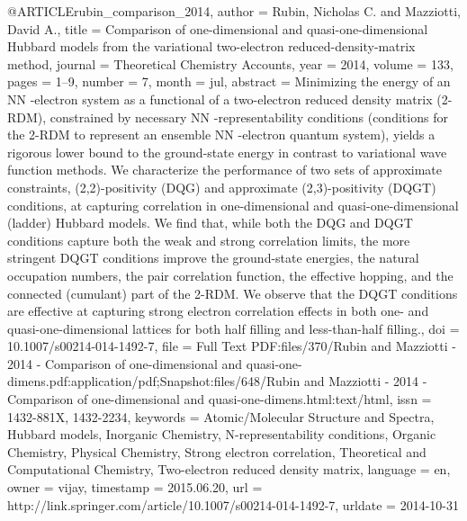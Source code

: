 @ARTICLE{rubin_comparison_2014,
  author = {Rubin, Nicholas C. and Mazziotti, David A.},
  title = {Comparison of one-dimensional and quasi-one-dimensional {Hubbard}
	models from the variational two-electron reduced-density-matrix method},
  journal = {Theoretical Chemistry Accounts},
  year = {2014},
  volume = {133},
  pages = {1--9},
  number = {7},
  month = jul,
  abstract = {Minimizing the energy of an NN -electron system as a functional of
	a two-electron reduced density matrix (2-RDM), constrained by necessary
	NN -representability conditions (conditions for the 2-RDM to represent
	an ensemble NN -electron quantum system), yields a rigorous lower
	bound to the ground-state energy in contrast to variational wave
	function methods. We characterize the performance of two sets of
	approximate constraints, (2,2)-positivity (DQG) and approximate (2,3)-positivity
	(DQGT) conditions, at capturing correlation in one-dimensional and
	quasi-one-dimensional (ladder) Hubbard models. We find that, while
	both the DQG and DQGT conditions capture both the weak and strong
	correlation limits, the more stringent DQGT conditions improve the
	ground-state energies, the natural occupation numbers, the pair correlation
	function, the effective hopping, and the connected (cumulant) part
	of the 2-RDM. We observe that the DQGT conditions are effective at
	capturing strong electron correlation effects in both one- and quasi-one-dimensional
	lattices for both half filling and less-than-half filling.},
  doi = {10.1007/s00214-014-1492-7},
  file = {Full Text PDF:files/370/Rubin and Mazziotti - 2014 - Comparison of one-dimensional and quasi-one-dimens.pdf:application/pdf;Snapshot:files/648/Rubin and Mazziotti - 2014 - Comparison of one-dimensional and quasi-one-dimens.html:text/html},
  issn = {1432-881X, 1432-2234},
  keywords = {Atomic/Molecular Structure and Spectra, Hubbard models, Inorganic
	Chemistry, N-representability conditions, Organic Chemistry, Physical
	Chemistry, Strong electron correlation, Theoretical and Computational
	Chemistry, Two-electron reduced density matrix},
  language = {en},
  owner = {vijay},
  timestamp = {2015.06.20},
  url = {http://link.springer.com/article/10.1007/s00214-014-1492-7},
  urldate = {2014-10-31}
}

